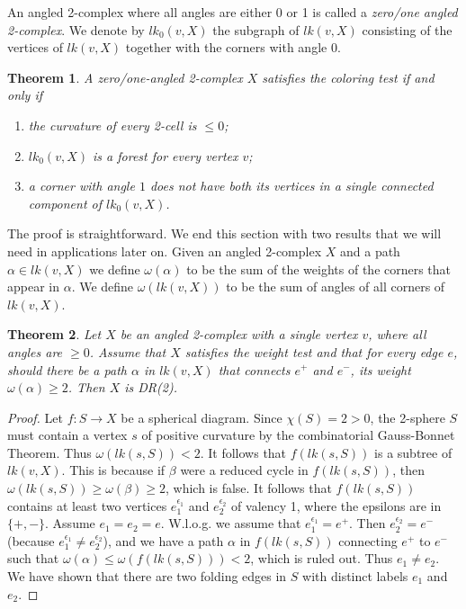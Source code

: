 \documentclass[12pt]{amsart}
\newtheorem{thm}{Theorem}[section]
\theoremstyle{definition}
\begin{document}
An angled 2-complex where all angles are either 0 or 1 is called a {\em zero/one angled 2-complex}.
We denote by 
$lk_0(v,X)$ the subgraph of $lk(v,X)$ consisting of the vertices of $lk(v,X)$ together with the corners with angle $0$. 

\begin{thm}\label{thm:npi} A zero/one-angled 2-complex $X$ satisfies the coloring test if and only if 
\begin{enumerate}
\item the curvature of every 2-cell is $\le 0$;
\item $lk_0(v,X)$ is a forest for every vertex $v$;
\item a corner with angle $1$ does not have both its vertices in a single connected component of $lk_0(v,X)$.
\end{enumerate}
\end{thm}

The proof is straightforward. We end this section with two results that we will need in applications later on. Given an angled 2-complex $X$ and a path $\alpha\in lk(v,X)$ we define $\omega (\alpha)$ to be the sum of the weights of the corners that appear in $\alpha $. We define $\omega(lk(v,X))$ to be the sum of angles of all corners of $lk(v,X)$.


\begin{thm}\label{thm:DR(2)+} Let $X$ be an angled 2-complex with a single vertex $v$, where all angles are $\ge 0$. Assume that $X$ satisfies the weight test and that for every edge $e$, should there be a path $\alpha$ in $lk(v,X)$ that connects $e^+$ and $e^-$, its weight $\omega(\alpha)\ge 2$. Then $X$ is DR(2).
\end{thm}


\begin{proof} Let $f\colon S\to X$ be a spherical diagram. Since $\chi(S)=2>0$, the 2-sphere $S$ must contain a vertex $s$ of positive curvature by the combinatorial Gauss-Bonnet Theorem. Thus $\omega(lk(s,S))< 2$. It follows that $f(lk(s,S))$ is a subtree of $lk(v,X)$. This is because if $\beta$ were a reduced cycle in $f(lk(s,S))$, then $\omega(lk(s,S))\ge \omega(\beta)\ge 2$, which is false. It follows that $f(lk(s,S))$ contains at least two vertices $e_1^{\epsilon_1}$ and $e_2^{\epsilon_2}$ of valency 1, where the epsilons are in $\{ +, -\}$. Assume $e_1=e_2=e$. W.l.o.g. we assume that $e_1^{\epsilon_1}=e^+$. Then $e_2^{\epsilon_2}=e^-$ (because $e_1^{\epsilon_1}\ne e_2^{\epsilon_2}$), and we have a path $\alpha$ in $f(lk(s,S))$ connecting $e^+$ to $e^-$ such that $\omega(\alpha)\le \omega(f(lk(s,S)))<2$, which is ruled out. Thus $e_1\ne e_2$. We have shown that there are two folding edges in $S$ with distinct labels $e_1$ and $e_2$.
\end{proof}
\end{document}
